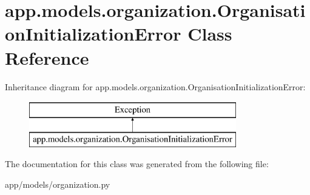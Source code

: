 \hypertarget{classapp_1_1models_1_1organization_1_1_organisation_initialization_error}{}\section{app.\+models.\+organization.\+Organisation\+Initialization\+Error Class Reference}
\label{classapp_1_1models_1_1organization_1_1_organisation_initialization_error}
Inheritance diagram for app.\+models.\+organization.\+Organisation\+Initialization\+Error\+:\begin{figure}[H]
\begin{center}
\leavevmode
\includegraphics[height=2.000000cm]{classapp_1_1models_1_1organization_1_1_organisation_initialization_error}
\end{center}
\end{figure}


The documentation for this class was generated from the following file\+:\begin{DoxyCompactItemize}
\item 
app/models/organization.\+py\end{DoxyCompactItemize}
